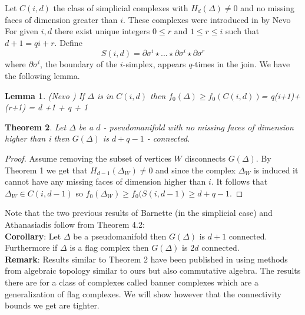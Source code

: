 \documentclass[a4paper]{article}
\newtheorem{theorem}{Theorem}[section]
\newtheorem{lemma}[theorem]{Lemma}
\begin{document}
{Let $C(i,d)$ the class of simplicial complexes with $H_d(\Delta)\neq 0$ and 
no missing faces of dimension greater than $i$. These complexes were introduced in \cite{nevo} by Nevo For given $i,d$  there exist unique integers $0 \leq r$ and $1 \leq r\leq i$ such that $d+1 = qi+r$. Define $$S(i,d) = \partial \sigma^i\star...\star \partial \sigma^i \star \partial \sigma^r $$ where $\partial \sigma^i$, the boundary of the $i$-simplex, appears $q$-times in the join. We have the following lemma.   \\

\begin{lemma} (Nevo \cite{nevo}) If $\Delta$ is in $C(i,d)$ then $f_0(\Delta)\geq f_0(C(i,d))$= q(i+1)+(r+1) = d +1 + q + 1 \\
\end{lemma}

\begin{theorem}
Let $\Delta$ be a $d$ - pseudomanifold with no missing faces of dimension higher than i then $G(\Delta)$ is $d+q-1$ - connected. \\ 
\end{theorem}

\begin{proof}
Assume removing the subset of vertices $W$ disconnects $G(\Delta)$. By Theorem 1 we get that $H_{d-1}(\Delta_W)\neq 0$ and since the complex $\Delta_W$ is induced it cannot have any missing faces of dimension higher than $i$. It follows that $\Delta_W \in C(i, d-1)$ so $f_0(\Delta_W) \geq f_0(S(i,d-1) \geq d+q-1 $. 

\end{proof} 

Note that the two previous results of Barnette (in the simplicial case) and Athanasiadis follow from Theorem 4.2: \\

\textbf{Corollary}: Let $\Delta$ be a pseudomanifold then $G(\Delta)$ is $d+1$ connected. Furthermore if $\Delta$ is a flag complex then $G(\Delta)$ is $2d$ connected.\\


\textbf{Remark}: Results similar to Theorem 2 have been published in \cite{adiprasito} using methods from algebraic topology similar to ours but also commutative algebra.  The results there are for a class of complexes called banner complexes which are a generalization of flag complexes. We will show however that the connectivity bounds we get are tighter. 

}
\end{document}
